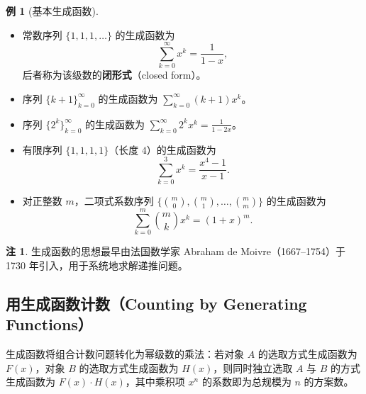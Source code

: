 \documentclass[UTF8,11pt,a4paper]{ctexbook}   %
\theoremstyle{definition}
\newtheorem{example}{例}[section]
\newtheorem{remark}{注}[section]
\begin{document}
\begin{example}[基本生成函数]
\begin{itemize}
    \item 常数序列 $\{1,1,1,\dots\}$ 的生成函数为
    \[
    \sum_{k=0}^{\infty} x^k = \frac{1}{1-x},
    \]
    后者称为该级数的\textbf{闭形式}（closed form）。
    \item 序列 $\{k+1\}_{k=0}^{\infty}$ 的生成函数为 $\displaystyle\sum_{k=0}^{\infty}(k+1)x^k$。
    \item 序列 $\{2^k\}_{k=0}^{\infty}$ 的生成函数为 $\displaystyle\sum_{k=0}^{\infty}2^k x^k = \frac{1}{1-2x}$。
    \item 有限序列 $\{1,1,1,1\}$（长度 $4$）的生成函数为
    \[
    \sum_{k=0}^{3} x^k = \frac{x^4-1}{x-1}.
    \]
    \item 对正整数 $m$，二项式系数序列 $\{\binom{m}{0},\binom{m}{1},\dots,\binom{m}{m}\}$ 的生成函数为
    \[
    \sum_{k=0}^{m}\binom{m}{k}x^k = (1+x)^m.
    \]
\end{itemize}
\end{example}

\begin{remark}
生成函数的思想最早由法国数学家 Abraham de Moivre（1667--1754）于 1730 年引入，用于系统地求解递推问题。
\end{remark}

\subsection{用生成函数计数（Counting by Generating Functions）}

生成函数将组合计数问题转化为幂级数的乘法：若对象 $A$ 的选取方式生成函数为 $F(x)$，对象 $B$ 的选取方式生成函数为 $H(x)$，则同时独立选取 $A$ 与 $B$ 的方式生成函数为 $F(x)\cdot H(x)$，其中乘积项 $x^n$ 的系数即为总规模为 $n$ 的方案数。
\end{document}
